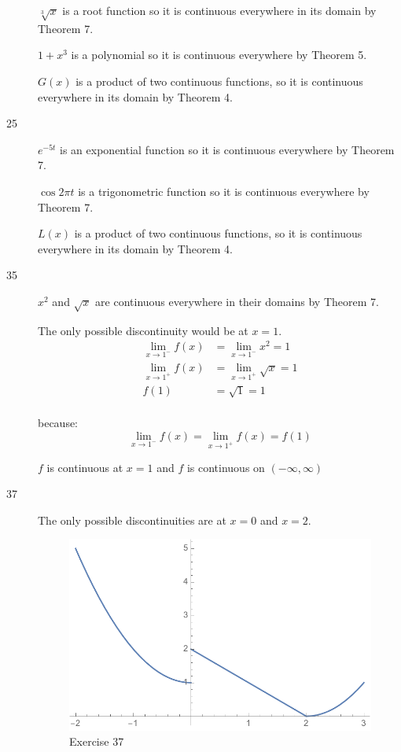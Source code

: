 \documentclass[letterpaper, landscape]{exam}
\begin{document}
\begin{description}
        $\sqrt[3]{x}$ is a root function so it is continuous everywhere in its
        domain by Theorem 7.

        $1 + x^3$ is a polynomial so it is continuous everywhere by Theorem 5.

        $G(x)$ is a product of two continuous functions, so it is continuous
        everywhere in its domain by Theorem 4.

      \item[25] 
        
        $e^{-5t}$ is an exponential function so it is continuous everywhere 
        by Theorem 7.

        $\cos 2 \pi t$ is a trigonometric function so it is continuous
        everywhere by Theorem 7.

        $L(x)$ is a product of two continuous functions, so it is continuous
        everywhere in its domain by Theorem 4.

      \item[35] $x^2$ and $\sqrt{x}$ are continuous everywhere in their domains
        by Theorem 7.

        The only possible discontinuity would be at $x = 1$.
        \begin{align*}
          \lim_{x \to 1^-} f(x) & = \lim_{x \to 1^-} x^2 = 1 \\
          \lim_{x \to 1^+} f(x) & = \lim_{x \to 1^+} \sqrt{x} = 1 \\
          f(1)                  & = \sqrt{1} = 1 \\
        \end{align*}

        because:
        \[
          \lim_{x \to 1^-} f(x) = \lim_{x \to 1^+} f(x) = f(1) 
        \]

        $f$ is continuous at $x = 1$ and $f$ is continuous on $(-\infty, \infty)$

      \item[37] The only possible discontinuities are at $x = 0$ and $x = 2$.

        \begin{figure}[H]
          \centering
          \includegraphics[scale = 0.5]{ex37.pdf}
          \caption{Exercise 37}
          \label{fig:ex37}
        \end{figure}


\end{description}
\end{document}
